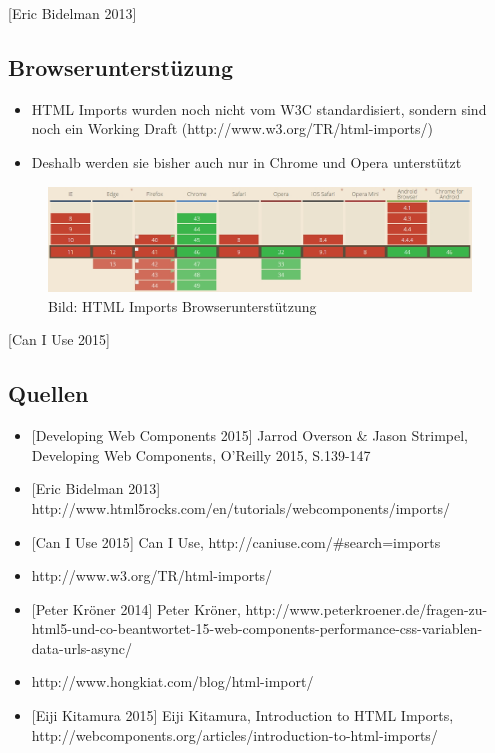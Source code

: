 {[}Eric Bidelman 2013{]}

\subsection{Browserunterstüzung}\label{browserunterstuxfczung}

\begin{itemize}
\tightlist
\item
  HTML Imports wurden noch nicht vom W3C standardisiert, sondern sind
  noch ein Working Draft (http://www.w3.org/TR/html-imports/)
\item
  Deshalb werden sie bisher auch nur in Chrome und Opera unterstützt
\end{itemize}

\begin{figure}[htbp]
\centering
\includegraphics{images/4-html-imports-browserunterstuetzung.jpg}
\caption{Bild: HTML Imports Browserunterstützung}
\end{figure}

{[}Can I Use 2015{]}

\subsection{Quellen}\label{quellen}

\begin{itemize}
\tightlist
\item
  {[}Developing Web Components 2015{]} Jarrod Overson \& Jason Strimpel,
  Developing Web Components, O'Reilly 2015, S.139-147
\item
  {[}Eric Bidelman 2013{]}
  http://www.html5rocks.com/en/tutorials/webcomponents/imports/
\item
  {[}Can I Use 2015{]} Can I Use, http://caniuse.com/\#search=imports
\item
  http://www.w3.org/TR/html-imports/
\item
  {[}Peter Kröner 2014{]} Peter Kröner,
  http://www.peterkroener.de/fragen-zu-html5-und-co-beantwortet-15-web-components-performance-css-variablen-data-urls-async/
\item
  http://www.hongkiat.com/blog/html-import/
\item
  {[}Eiji Kitamura 2015{]} Eiji Kitamura, Introduction to HTML Imports,
  http://webcomponents.org/articles/introduction-to-html-imports/
\end{itemize}
